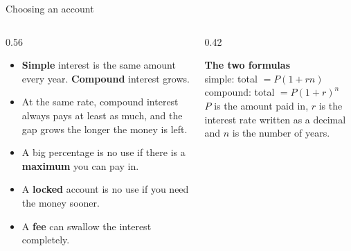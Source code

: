 \documentclass[aspectratio=169,12pt]{beamer}
\newcommand{\cardhead}[1]{{\color{\cardaccent}\bfseries #1}}
\begin{document}
\begin{frame}{Choosing an account}
\begin{columns}[T,onlytextwidth]
\begin{column}{0.56\textwidth}
  \begin{card}[slidehead]
    \small
    \begin{itemize}[<+->]\itemsep=1.4mm
      \item \textbf{Simple} interest is the same amount every year.
            \textbf{Compound} interest grows.
      \item At the same rate, compound interest always pays at least as
            much, and the gap grows the longer the money is left.
      \item A big percentage is no use if there is a \textbf{maximum} you
            can pay in.
      \item A \textbf{locked} account is no use if you need the money sooner.
      \item A \textbf{fee} can swallow the interest completely.
    \end{itemize}
  \end{card}
\end{column}
\begin{column}{0.42\textwidth}
  \begin{formulacard}[slidehead]
    \cardhead{The two formulas}\\[1.5mm]
    simple: total $= P(1+rn)$\\[1mm]
    compound: total $= P(1+r)^{n}$\\[1.5mm]
    $P$ is the amount paid in, $r$ is the interest rate written as a
    decimal and $n$ is the number of years.
  \end{formulacard}

  \vspace{2mm}
\end{column}
\end{columns}
\end{frame}
\end{document}
